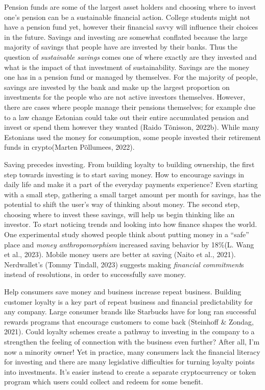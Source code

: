 \documentclass[
  12pt,
  letterpaper,
  DIV=11,
  numbers=noendperiod]{scrartcl}
\begin{document}
Pension funds are some of the largest asset holders and choosing where
to invest one's pension can be a sustainable financial action. College
students might not have a pension fund yet, however their financial
savvy will influence their choices in the future. Savings and investing
are somewhat conflated because the large majority of savings that people
have are invested by their banks. Thus the question of \emph{sustainable
savings} comes one of where exactly are they invested and what is the
impact of that investment of sustainability. Savings are the money one
has in a pension fund or managed by themselves. For the majority of
people, savings are invested by the bank and make up the largest
proportion on investments for the people who are not active investors
themselves. However, there are cases where people manage their pensions
themselves; for example due to a law change Estonian could take out
their entire accumulated pension and invest or spend them however they
wanted (Raido Tõnisson, 2022b). While many Estonians used the money for
consumption, some people invested their retirement funds in
crypto(Marten Põllumees, 2022).

Saving precedes investing. From building loyalty to building ownership,
the first step towards investing is to start saving money. How to
encourage savings in daily life and make it a part of the everyday
payments experience? Even starting with a small step, gathering a small
target amount per month for savings, has the potential to shift the
user's way of thinking about money. The second step, choosing where to
invest these savings, will help us begin thinking like an investor. To
start noticing trends and looking into how finance shapes the world. One
experimental study showed people think about putting money in a ``safe''
place and \emph{money anthropomorphism} increased saving behavior by
18\%(L. Wang et al., 2023). Mobile money users are better at saving
(Naito et al., 2021). Nerdwallet's (Tommy Tindall, 2023) suggests making
\emph{financial commitment}s instead of resolutions, in order to
successfully save money.

Help consumers save money and business increase repeat business.
Building customer loyalty is a key part of repeat business and financial
predictability for any company. Large consumer brands like Starbucks
have for long ran successful rewards programs that encourage customers
to come back (Steinhoff \& Zondag, 2021). Could loyalty schemes create a
pathway to investing in the company to a strengthen the feeling of
connection with the business even further? After all, I'm now a minority
owner! Yet in practice, many consumers lack the financial literacy for
investing and there are many legislative difficulties for turning
loyalty points into investments. It's easier instead to create a
separate cryptocurrency or token program which users could collect and
redeem for some benefit.
\end{document}

